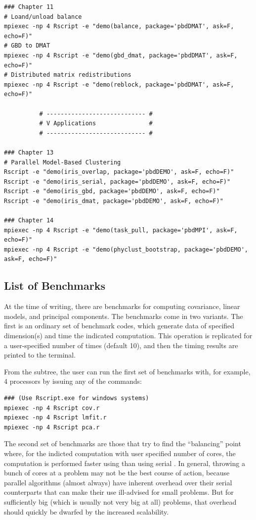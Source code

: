 \begin{lstlisting}[title=List of Demos]
### Chapter 11
# Loand/unload balance
mpiexec -np 4 Rscript -e "demo(balance, package='pbdDMAT', ask=F, echo=F)"
# GBD to DMAT
mpiexec -np 4 Rscript -e "demo(gbd_dmat, package='pbdDMAT', ask=F, echo=F)"
# Distributed matrix redistributions
mpiexec -np 4 Rscript -e "demo(reblock, package='pbdDMAT', ask=F, echo=F)"

		  # ---------------------------- #
		  # V Applications               #
		  # ---------------------------- #

### Chapter 13
# Parallel Model-Based Clustering
Rscript -e "demo(iris_overlap, package='pbdDEMO', ask=F, echo=F)"
Rscript -e "demo(iris_serial, package='pbdDEMO', ask=F, echo=F)"
Rscript -e "demo(iris_gbd, package='pbdDEMO', ask=F, echo=F)"
Rscript -e "demo(iris_dmat, package='pbdDEMO', ask=F, echo=F)"

### Chapter 14
mpiexec -np 4 Rscript -e "demo(task_pull, package='pbdMPI', ask=F, echo=F)"
mpiexec -np 4 Rscript -e "demo(phyclust_bootstrap, package='pbdDEMO', ask=F, echo=F)"

\end{lstlisting}





\subsection{List of Benchmarks}

At the time of writing, there are benchmarks for computing covariance, linear
models, and principal components. The benchmarks come in two variants. The
first is an ordinary set of benchmark codes, which generate data of specified
dimension(s) and time the indicated computation. This operation is replicated
for a user-specified number of times (default 10), and then the timing results
are printed to the terminal.  

From the  subtree, the user can run the first set of
benchmarks with, for example, 4 processors by issuing any of the commands:
\begin{lstlisting}
### (Use Rscript.exe for windows systems)
mpiexec -np 4 Rscript cov.r
mpiexec -np 4 Rscript lmfit.r
mpiexec -np 4 Rscript pca.r
\end{lstlisting}

The second set of benchmarks are those that try to find the ``balancing''
point where, for the indicted computation with user specified number of
cores, the computation is performed faster using 
than using serial . In general, throwing a bunch of cores at
a problem may not be the best course of action, because parallel algorithms
(almost always) have inherent overhead over their serial counterparts that
can make their use ill-advised for small problems. But for sufficiently
big (which is usually not very big at all) problems, that overhead should
quickly be dwarfed by the increased scalability.

